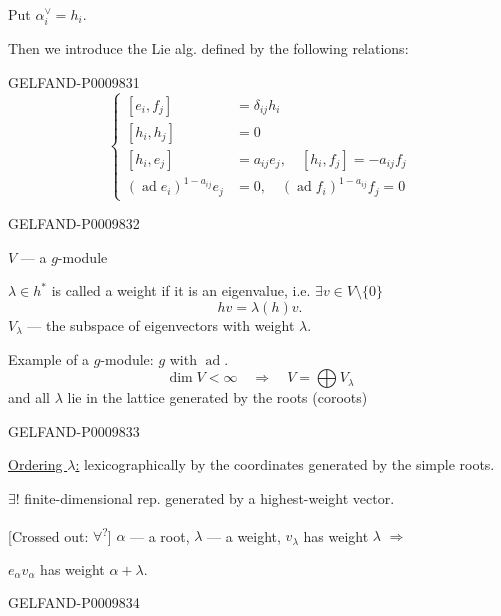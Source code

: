 Put $\alpha_i^{\vee}=h_i$.

Then we introduce the Lie alg. defined by the following relations:


\begin{GelfandAdjacentEvidence}{GELFAND-P000983}{1}
\[
\tag{*}
\left\{
\begin{aligned}
[e_i,f_j]&=\delta_{ij}h_i\\
[h_i,h_j]&=0\\
[h_i,e_j]&=a_{ij}e_j,\quad [h_i,f_j]=-a_{ij}f_j\\
(\operatorname{ad}e_i)^{1-a_{ij}}e_j&=0,\quad
(\operatorname{ad}f_i)^{1-a_{ij}}f_j=0
\end{aligned}
\right.
\]
\end{GelfandAdjacentEvidence}
\begin{GelfandAdjacentEvidence}{GELFAND-P000983}{2}


$V$ --- a $g$-module

$\lambda\in h^*$ is called a weight if it is an eigenvalue, i.e. $\exists v\in V\setminus\{0\}$
\[
hv=\lambda(h)v.
\]
$V_\lambda$ --- the subspace of eigenvectors with weight $\lambda$.

Example of a $g$-module: $g$ with $\operatorname{ad}$.
\[
\dim V<\infty\quad\Rightarrow\quad V=\bigoplus V_\lambda
\]
and all $\lambda$ lie in the lattice generated by the roots (coroots)
\end{GelfandAdjacentEvidence}
\begin{GelfandAdjacentEvidence}{GELFAND-P000983}{3}


\underline{Ordering $\lambda$:} lexicographically by the coordinates generated by the simple roots.

$\exists!$ finite-dimensional rep. generated by a highest-weight vector.

[Crossed out: $\forall$\textsuperscript{?}] $\alpha$ --- a root, $\lambda$ --- a weight, $v_\lambda$ has weight $\lambda$ $\Rightarrow$

$e_\alpha v_\alpha$ has weight $\alpha+\lambda$.
\end{GelfandAdjacentEvidence}
\begin{GelfandAdjacentEvidence}{GELFAND-P000983}{4}

\end{GelfandAdjacentEvidence}
